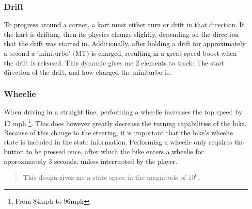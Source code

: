 \subsubsection{Drift}
To progress around a corner, a kart must either turn or drift in that direction. If the kart is drifting, then its physics change slightly, depending on the direction that the drift was started in. Additionally, after holding a drift for approximately a second a 'miniturbo' (MT) is charged, resulting in a great speed boost when the drift is released. This dynamic gives me 2 elements to track: The start direction of the drift, and how charged the miniturbo is. 
\subsubsection{Wheelie}
When driving in a straight line, performing a wheelie increases the top speed by 12 mph \footnote{From 84mph to 96mph}. This does however greatly decrease the turning capabilities of the bike. Because of this change to the steering, it is important that the bike's wheelie state is included in the state information. Performing a wheelie only requires the button to be pressed once, after which the bike enters a wheelie for approximately 3 seconds, unless interrupted by the player.%
\begin{quote}
This design gives me a state space in the magnitude of $10^6$.
\end{quote}
